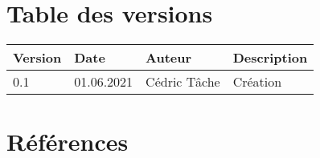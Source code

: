 \documentclass[french,11pt]{article}
\begin{document}


\section *{Table des versions}
\vspace*{0.5 cm}

\begin{table}[h]
    \begin{tabularx}{\columnwidth}{ | p{1.5cm} |p{1.5cm} | p{2.5cm} | X |}
        \hline
        \textbf{Version} & \textbf{Date} & \textbf{Auteur} & \textbf{Description} \\
        \hline
        0.1 & 01.06.2021 & Cédric Tâche & Création \\
        \hline
    \end{tabularx}
\end{table}


\newpage

\hypersetup{
	hidelinks,
	allcolors=black,
	linktocpage,
	linktoc=all
}

\tableofcontents

\newpage




\section{Références}

\renewcommand{\bibsection}{}

\end{document}
